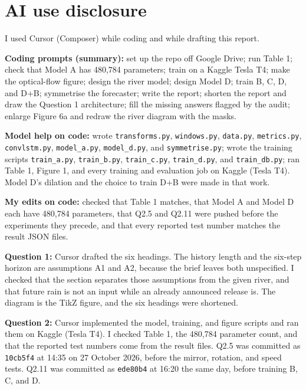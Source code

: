 \documentclass[11pt,a4paper]{article}
\begin{document}
\section*{AI use disclosure}
I used Cursor (Composer) while coding and while drafting this report.

\noindent\textbf{Coding prompts (summary):} set up the repo off Google Drive; run Table 1; check that Model A has 480{,}784 parameters; train on a Kaggle Tesla T4; make the optical-flow figure; design the river model; design Model D; train B, C, D, and D+B; symmetrise the forecaster; write the report; shorten the report and draw the Question 1 architecture; fill the missing answers flagged by the audit; enlarge Figure 6a and redraw the river diagram with the masks.

{\sloppy
\noindent\textbf{Model help on code:} wrote \texttt{transforms.py}, \texttt{windows.py}, \texttt{data.py}, \texttt{metrics.py}, \texttt{convlstm.py}, \texttt{model\_a.py}, \texttt{model\_d.py}, and \texttt{symmetrise.py}; wrote the training scripts \texttt{train\_a.py}, \texttt{train\_b.py}, \texttt{train\_c.py}, \texttt{train\_d.py}, and \texttt{train\_db.py}; ran Table 1, Figure 1, and every training and evaluation job on Kaggle (Tesla T4). Model D's dilation and the choice to train D+B were made in that work.
\par}

\noindent\textbf{My edits on code:} checked that Table 1 matches, that Model A and Model D each have 480{,}784 parameters, that Q2.5 and Q2.11 were pushed before the experiments they precede, and that every reported test number matches the result JSON files.

\noindent\textbf{Question 1:} Cursor drafted the six headings. The history length and the six-step horizon are assumptions A1 and A2, because the brief leaves both unspecified. I checked that the section separates those assumptions from the given river, and that future rain is not an input while an already announced release is. The diagram is the TikZ figure, and the six headings were shortened.

\noindent\textbf{Question 2:} Cursor implemented the model, training, and figure scripts and ran them on Kaggle (Tesla T4). I checked Table 1, the 480{,}784 parameter count, and that the reported test numbers come from the result files. Q2.5 was committed as \texttt{10cb5f4} at 14:35 on 27 October 2026, before the mirror, rotation, and speed tests. Q2.11 was committed as \texttt{ede80b4} at 16:20 the same day, before training B, C, and D.
\end{document}
